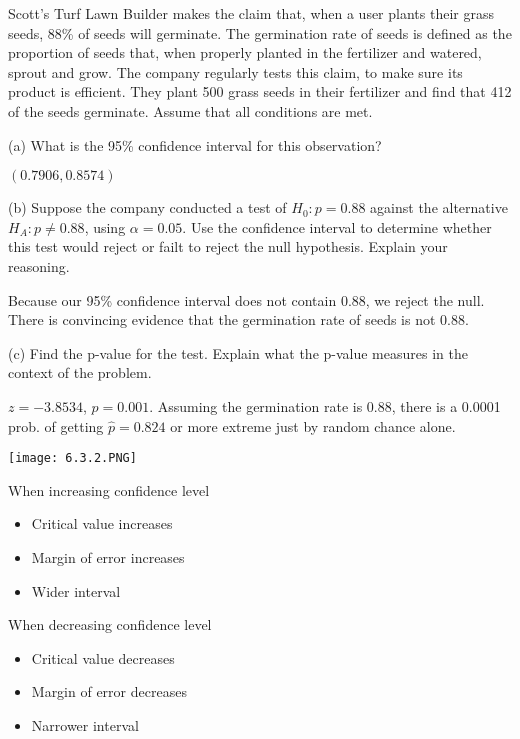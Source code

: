 \documentclass[../stats.tex]{subfiles}
\begin{document}
\begin{example}
    Scott's Turf Lawn Builder makes the claim that, when a user plants their grass seeds, 88\% of seeds will germinate. The germination rate of seeds is defined as the proportion of seeds that, when properly planted in the fertilizer and watered, sprout and grow. The company regularly tests this claim, to make sure its product is efficient. 
    They plant 500 grass seeds in their fertilizer and find that 412 of the seeds germinate. Assume that all conditions are met.

    (a) What is the 95\% confidence interval for this observation?

    $(0.7906, 0.8574)$

    (b) Suppose the company conducted a test of $H_0: p=0.88$ against the alternative $H_A: p\neq 0.88$, using $\alpha=0.05$. Use the confidence interval to determine whether this test would reject or failt to reject the null hypothesis. Explain your reasoning.

    Because our 95\% confidence interval does not contain 0.88, we reject the null. There is convincing evidence that the germination rate of seeds is not 0.88.

    (c) Find the p-value for the test. Explain what the p-value measures in the context of the problem.

    $z=-3.8534$, $p=0.001$. Assuming the germination rate is 0.88, there is a 0.0001 prob. of getting $\hat{p}=0.824$ or more extreme just by random chance alone.
\end{example}

\begin{center}
    \texttt{[image: 6.3.2.PNG]}
\end{center}

When increasing confidence level 
\begin{itemize}
    \item Critical value increases 
    \item Margin of error increases 
    \item Wider interval 
\end{itemize}

When decreasing confidence level 
\begin{itemize}
    \item Critical value decreases 
    \item Margin of error decreases
    \item Narrower interval 
\end{itemize}
\end{document}
